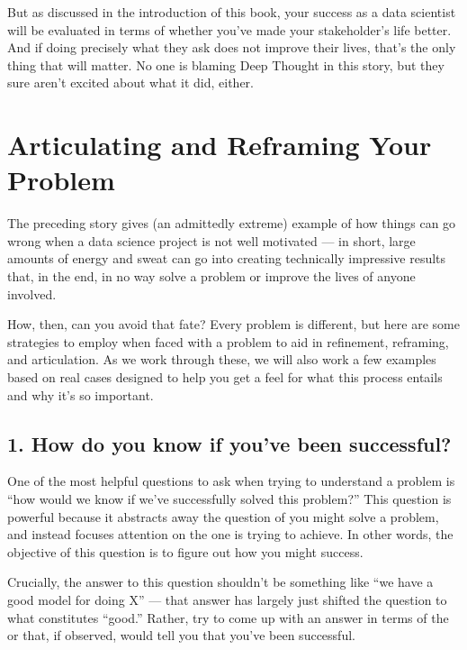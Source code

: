 \documentclass[letterpaper,10pt,english]{jupyterBook}
\begin{document}
\sphinxAtStartPar
But as discussed in the introduction of this book, your success as a data scientist will  be evaluated in terms of whether you’ve made your stakeholder’s life better. And if doing precisely what they ask does not improve their lives, that’s the only thing that will matter. No one is blaming Deep Thought in this story, but they sure aren’t excited about what it did, either.


\section{Articulating and Reframing Your Problem}
\label{\detokenize{20_problems_to_questions/10_solving_the_right_problem:articulating-and-reframing-your-problem}}
\sphinxAtStartPar
The preceding story gives (an admittedly extreme) example of how things can go wrong when a data science project is not well motivated — in short, large amounts of energy and sweat can go into creating technically impressive results that, in the end, in no way solve a problem or improve the lives of anyone involved.

\sphinxAtStartPar
How, then, can you avoid that fate? Every problem is different, but here are some strategies to employ when faced with a problem to aid in refinement, reframing, and articulation. As we work through these, we will also work a few examples based on real cases designed to help you get a feel for what this process entails and why it’s so important.


\subsection{1. How do you know if you’ve been successful?}
\label{\detokenize{20_problems_to_questions/10_solving_the_right_problem:how-do-you-know-if-you-ve-been-successful}}
\sphinxAtStartPar
One of the most helpful questions to ask when trying to understand a problem is “how would we know if we’ve successfully solved this problem?” This question is powerful because it abstracts away the question of  you might solve a problem, and instead focuses attention on the  one is trying to achieve. In other words, the objective of this question is to figure out how you might  success.

\sphinxAtStartPar
Crucially, the answer to this question shouldn’t be something like “we have a good model for doing X” — that answer has largely just shifted the question to what constitutes “good.” Rather, try to come up with an answer in terms of the  or  that, if observed, would tell you that you’ve been successful.
\end{document}
